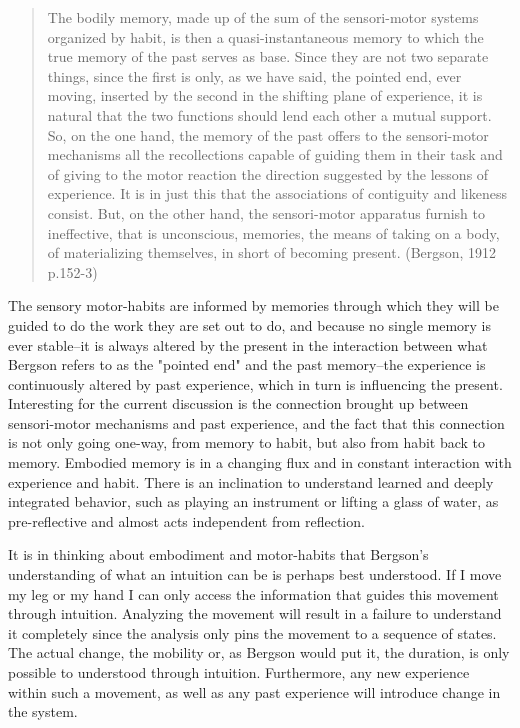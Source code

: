 \documentclass[11pt]{article}
\makeatletter
\newcommand{\citeprocitem}[2]{\hyper@linkstart{cite}{citeproc_bib_item_#1}#2\hyper@linkend}
\makeatother
\begin{document}
\begin{quote}
The bodily memory, made up of the sum of the sensori-motor systems organized by habit, is then a quasi-instantaneous memory to which the true memory of the past serves as base. Since they are not two separate things, since the first is only, as we have said, the pointed end, ever moving, inserted by the second in the shifting plane of experience, it is natural that the two functions should lend each other a mutual support. So, on the one hand, the memory of the past offers to the sensori-motor mechanisms all the recollections capable of guiding them in their task and of giving to the motor reaction the direction suggested by the lessons of experience. It is in just this that the associations of contiguity and likeness consist. But, on the other hand, the sensori-motor apparatus furnish to ineffective, that is unconscious, memories, the means of taking on a body, of materializing themselves, in short of becoming present.  (\citeprocitem{2}{Bergson, 1912} p.152-3)
\end{quote}

The sensory motor-habits are informed by memories through which they will be guided to do the work they are set out to do, and because no single memory is ever stable--it is always altered by the present in the interaction between what Bergson refers to as the "pointed end" and the past memory--the experience is continuously altered by past experience, which in turn is influencing the present.
Interesting for the current discussion is the connection brought up between sensori-motor mechanisms and past experience, and the fact that this connection is not only going one-way, from memory to habit, but also from habit back to memory.
Embodied memory is in a changing flux and in constant interaction with experience and habit.
There is an inclination to understand learned and deeply integrated behavior, such as playing an instrument or lifting a glass of water, as pre-reflective and almost acts independent from reflection.

It is in thinking about embodiment and motor-habits that Bergson's understanding of what an intuition can be is perhaps best understood.
If I move my leg or my hand I can only access the information that guides this movement through intuition.
Analyzing the movement will result in a failure to understand it completely since the analysis only pins the movement to a sequence of states.
The actual change, the mobility or, as Bergson would put it, the duration, is only possible to understood through intuition.
Furthermore, any new experience within such a movement, as well as any past experience will introduce change in the system.
\end{document}
